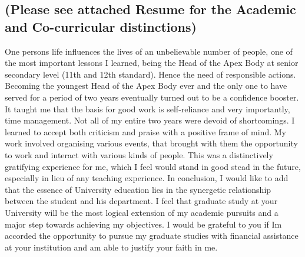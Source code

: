 \documentclass[a4paper,12pt]{article}%
\begin{document}
	  \subsection{ (Please see attached Resume  for the Academic and Co-curricular distinctions)}
One persons life influences the lives of an unbelievable number of people, one of the most important lessons I learned, being the Head of the Apex Body at senior secondary level (11th and 12th standard). Hence the need of responsible actions. Becoming the youngest Head of the Apex Body ever and the only one to have served for a period of two years eventually turned out to be a confidence booster. It taught me that the basis for good work is self-reliance and very importantly, time management. Not all of my entire two years were devoid of shortcomings. I learned to accept both criticism and praise with a positive frame of mind. My work involved organising various events, that brought with them the opportunity to work and interact with various kinds of people. This was a distinctively gratifying experience for me, which I feel would stand in good stead in the future, especially in lieu of any teaching experience.
  In conclusion, I would like to add that the essence of University education lies in the synergetic relationship between the student and his department. I feel that graduate study at your University will be the most logical extension of my academic pursuits and a major step towards achieving my objectives. I would be grateful to you if Im accorded the opportunity to pursue my graduate studies with financial assistance at your institution and am able to justify your faith in me.
  \newpage
\end{document}
